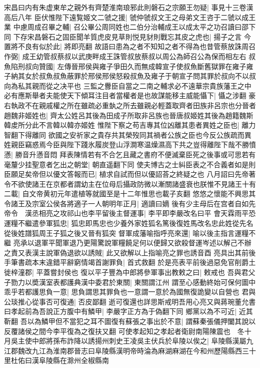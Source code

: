 宋昌曰内有朱虚東牟之親外有齊楚淮南琅邪此則磐石之宗願王勿疑|{
	事見十三卷漢高后八年}
臣伏惟陛下遠覧姬文二虢之援|{
	虢仲虢叔文王之母弟文王咨于二虢以成王業}
中慮周成召畢之輔|{
	召公畢公周同姓也二伯分治輔成王以成太平之功召讀曰邵下同}
下存宋昌磐石之固臣聞羊質虎皮見草則悦見豺則戰忘其皮之虎也|{
	揚子之言}
今置將不良有似於此|{
	將即亮翻}
故語曰患為之者不知知之者不得為也昔管蔡放誅周召作弼|{
	成王幼管叔蔡叔以武庚畔成王誅管叔放蔡叔以周公為師召公為保而相左右}
叔魚陷刑叔向贊國|{
	左傳晉邢侯與雍子爭田久而無成韓宣子使叔魚斷舊獄罪在雍子雍子納其女於叔魚叔魚蔽罪於邢侯邢侯怒殺叔魚及雍子于朝宣子問其罪於叔向不以叔向為私其親而從之决平也}
三監之釁臣自當之二南之輔求必不遠華宗貴族藩王之中必有應斯舉者夫能使天下傾耳注目者當權者是也故謀能移主威能懾下|{
	懾之涉翻}
豪右執政不在親戚權之所在雖疏必重埶之所去雖親必輕蓋取齊者田族非呂宗也分晉者趙魏非姬姓也|{
	齊太公姓呂其後為田成子所取非呂族也晉唐叔姬姓其後為趙籍魏斯韓䖍所分此不言韓以韓亦姬姓}
惟陛下察之苟吉專其位凶離其患者異姓之臣也|{
	離力智翻下得離同}
欲國之安祈家之貴存共其榮歿同其禍者公族之臣也今反公族疏而異姓親臣竊惑焉今臣與陛下踐氷履炭登山浮澗寒温燥濕高下共之豈得離陛下哉不勝憤懣|{
	勝音升懣音悶}
拜表陳情若有不合乞且藏之書府不便滅棄臣死之後事或可思若有毫釐少挂聖意者乞出之朝堂|{
	朝直遥翻下同}
使夫博古之士糾臣表之不合義者如是則臣願足矣帝但以優文答報而已|{
	植求自試而但以優詔荅之終疑之也}
八月詔曰先帝著令不欲使諸王在京都者謂幼主在位母后攝政防微以漸關諸盛衰也朕惟不見諸王十有二載|{
	自文帝黄初元年遣植等就國至是十二年惟思也載子亥翻}
悠悠之懷能不興思其令諸王及宗室公侯各將適子一人朝明年正月|{
	適讀曰嫡}
後有少主母后在宫者自如先帝令　漢丞相亮之攻祁山也李平留後主督運事|{
	李平即李嚴改名曰平}
會天霖雨平恐運糧不繼遣參軍狐忠|{
	狐忠即馬忠也少養外家姓狐名篤後復姓馬改名忠此姓從先名從後姓譜狐周王子狐之後又晉有狐突}
督軍成藩喻指呼亮來還|{
	喻以後主指言運糧不繼}
亮承以退軍平聞軍退乃更陽驚說軍糧饒足何以便歸又欲殺督運岑述以解己不辦之責又表漢主說軍偽退欲以誘賊|{
	此又欲解以上指喻亮之罪也誘音酉}
亮具出其前後手筆書疏本末違錯平辭窮情竭首謝罪負|{
	首式救翻}
於是亮表平前後過惡免官削爵土徙梓潼郡|{
	平蓋嘗封侯也}
復以平子豐為中郎將參軍事出教敕之曰|{
	敕戒也}
吾與君父子勠力以奬漢室表都護典漢中委君於東關|{
	東關謂江州}
謂至心感動終始可保何圖中乖乎若都護思負一意|{
	思負謂思其罪負也一意謂一意於為國無復詭變以自營也}
君與公琰推心從事否可復通|{
	否皮鄙翻}
逝可復還也詳思斯戒明吾用心亮又與蔣琬董允書曰孝起前為吾說正方腹中有鱗甲|{
	李嚴字正方為于偽翻下同}
鄉黨以為不可近|{
	近其靳翻}
吾以為鱗甲但不當犯之耳不圖復有蘇張之事出於不意|{
	謂蘇秦張儀押闔其說以反覆諸侯之間今李平復為之復扶又翻}
可使孝起知之孝起者衛尉南陽陳震也　冬十月吳主使中郎將孫布詐降以誘揚州刺史王凌吳主伏兵於阜陵以俟之|{
	阜陵縣漢屬九江郡魏改九江為淮南郡晉志曰阜陵縣漢明帝時淪為麻湖麻湖在今和州歷陽縣西三十里杜佑曰漢阜陵縣在滁州全椒縣南}
